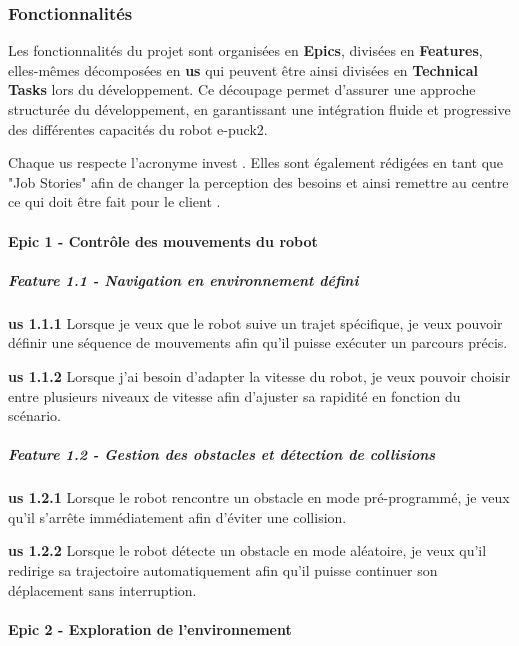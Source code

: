 \subsubsection{Fonctionnalités}

Les fonctionnalités du projet sont organisées en \textbf{Epics}, divisées en \textbf{Features}, elles-mêmes décomposées en \textbf{\acrfull{us}} qui peuvent être ainsi divisées en \textbf{Technical Tasks} lors du développement.
Ce découpage permet d’assurer une approche structurée du développement, en garantissant une intégration fluide et progressive des différentes capacités du robot e-puck2.

Chaque \acrshort{us} respecte l'acronyme \acrfull{invest} \autocite{alliance_what_2015}.
Elles sont également rédigées en tant que "Job Stories" afin de changer la perception des besoins et ainsi remettre au centre ce qui doit être fait pour le client \autocite{klement_replacing_2018}.

\paragraph{Epic 1 - Contrôle des mouvements du robot}

\subparagraph{Feature 1.1 - Navigation en environnement défini}

\textbf{\acrshort{us} 1.1.1} Lorsque je veux que le robot suive un trajet spécifique, je veux pouvoir définir une séquence de mouvements afin qu'il puisse exécuter un parcours précis.

\textbf{\acrshort{us} 1.1.2} Lorsque j’ai besoin d’adapter la vitesse du robot, je veux pouvoir choisir entre plusieurs niveaux de vitesse afin d’ajuster sa rapidité en fonction du scénario.

\subparagraph{Feature 1.2 - Gestion des obstacles et détection de collisions}

\textbf{\acrshort{us} 1.2.1} Lorsque le robot rencontre un obstacle en mode pré-programmé, je veux qu’il s’arrête immédiatement afin d’éviter une collision.

\textbf{\acrshort{us} 1.2.2} Lorsque le robot détecte un obstacle en mode aléatoire, je veux qu’il redirige sa trajectoire automatiquement afin qu’il puisse continuer son déplacement sans interruption.

\paragraph{Epic 2 - Exploration de l’environnement}

